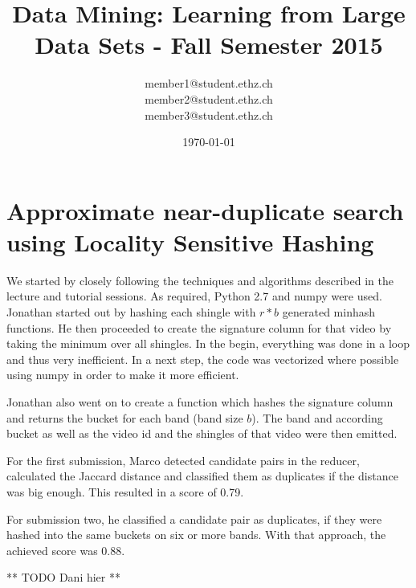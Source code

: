 \documentclass[a4paper, 11pt]{article}
\title{Data Mining: Learning from Large Data Sets - Fall Semester 2015}
\author{member1@student.ethz.ch\\ member2@student.ethz.ch\\ member3@student.ethz.ch\\}
\date{\today}
\begin{document}
\maketitle

\section*{Approximate near-duplicate search using Locality Sensitive Hashing}
We started by closely following the techniques and algorithms described in the lecture and tutorial sessions. As required, Python 2.7 and numpy were used.
Jonathan started out by hashing each shingle with $r * b$ generated minhash functions. He then proceeded to create the signature column for that video by taking the minimum over all shingles.
In the begin, everything was done in a loop and thus very inefficient. In a next step, the code was vectorized where possible using numpy in order to make it more efficient.

Jonathan also went on to create a function which hashes the signature column and returns the bucket for each band (band size $b$). The band and according bucket as well as the video id and the shingles of that video were then emitted.

For the first submission, Marco detected candidate pairs in the reducer, calculated the Jaccard distance and classified them as duplicates if the distance was big enough. This resulted in a score of 0.79.

For submission two, he classified a candidate pair as duplicates, if they were hashed into the same buckets on six or more bands. With that approach, the achieved score was 0.88.

** TODO Dani hier **
\end{document}
